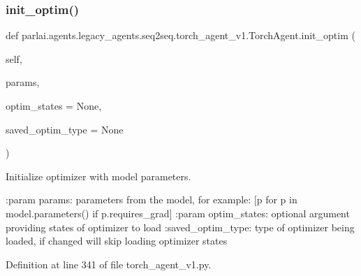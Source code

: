 \mbox{\label{classparlai_1_1agents_1_1legacy__agents_1_1seq2seq_1_1torch__agent__v1_1_1TorchAgent_a1727b17db185dcc7237d893018c7b76c}} 
\subsubsection{\texorpdfstring{init\+\_\+optim()}{init\_optim()}}
{\footnotesize\ttfamily def parlai.\+agents.\+legacy\+\_\+agents.\+seq2seq.\+torch\+\_\+agent\+\_\+v1.\+Torch\+Agent.\+init\+\_\+optim (\begin{DoxyParamCaption}\item[{}]{self,  }\item[{}]{params,  }\item[{}]{optim\+\_\+states = {\ttfamily None},  }\item[{}]{saved\+\_\+optim\+\_\+type = {\ttfamily None} }\end{DoxyParamCaption})}

\begin{DoxyVerb}Initialize optimizer with model parameters.

:param params:       parameters from the model, for example:
             [p for p in model.parameters() if p.requires_grad]
:param optim_states: optional argument providing states of optimizer
             to load
:saved_optim_type:   type of optimizer being loaded, if changed will
             skip loading optimizer states
\end{DoxyVerb}
 

Definition at line 341 of file torch\+\_\+agent\+\_\+v1.\+py.


